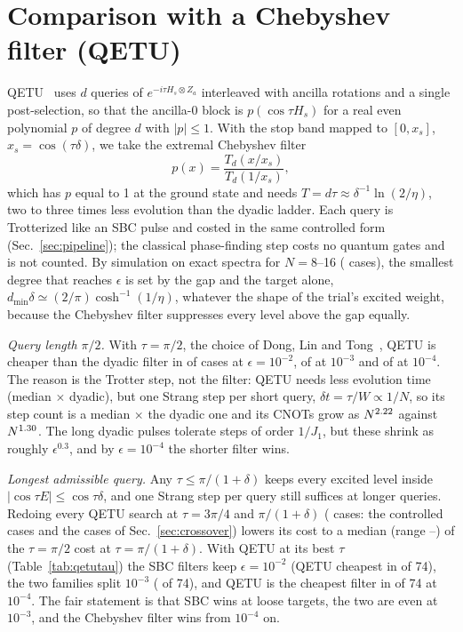 \documentclass[aps,pra,twocolumn,superscriptaddress,nofootinbib]{revtex4-2}
\begin{document}
\section{Comparison with a Chebyshev filter (QETU)}
\label{sec:qetu}

QETU~\cite{Dong2022} uses $d$ queries of $e^{-i\tau H_s\otimes Z_a}$ interleaved with ancilla rotations and a single
post-selection, so that the ancilla-0 block is $p(\cos\tau H_s)$ for a real even polynomial $p$ of degree $d$ with
$|p|\le1$. With the stop band mapped to $[0,x_s]$, $x_s=\cos(\tau\delta)$, we take the extremal Chebyshev filter
\begin{equation}
p(x)=\frac{T_d(x/x_s)}{T_d(1/x_s)},
\end{equation}
which has $p$ equal to 1 at the ground state and needs $T=d\tau\approx\delta^{-1}\ln(2/\eta)$, two to three times less
evolution than the dyadic ladder. Each query is Trotterized like an SBC pulse and costed in the same controlled form
(Sec.~\ref{sec:pipeline}); the classical phase-finding step costs no quantum gates and is not counted. By simulation
on exact spectra for $N=8$--16 (\empN{} cases), the smallest degree that reaches $\epsilon$ is set by the gap and the
target alone, $d_{\min}\delta\simeq(2/\pi)\cosh^{-1}(1/\eta)$, whatever the shape of the trial's excited weight,
because the Chebyshev filter suppresses every level above the gap equally.

\emph{Query length $\pi/2$.} With $\tau=\pi/2$, the choice of Dong, Lin and Tong~\cite{Dong2022}, QETU is cheaper than
the dyadic filter in \goQetuWinsTwo{} of \goCasesTwo{} cases at $\epsilon=10^{-2}$, \goQetuWinsThree{} of
\goCasesThree{} at $10^{-3}$ and \goQetuWinsFour{} of \goCasesFour{} at $10^{-4}$. The reason is the Trotter step, not
the filter: QETU needs less evolution time (median \fQDtime$\times$ dyadic), but one Strang step per short query,
$\delta t=\tau/W\propto1/N$, so its step count is a median \fQDsteps$\times$ the dyadic one and its CNOTs grow as
$N^{2.22}$ against $N^{1.30}$. The long dyadic pulses tolerate steps of order $1/J_1$, but these shrink as
roughly $\epsilon^{0.3}$, and by $\epsilon=10^{-4}$ the shorter filter wins.

\emph{Longest admissible query.} Any $\tau\le\pi/(1+\delta)$ keeps every excited level inside
$|\cos\tau E|\le\cos\tau\delta$, and one Strang step per query still suffices at longer queries. Redoing every QETU
search at $\tau=3\pi/4$ and $\pi/(1+\delta)$ (\tauNcases{} cases: the \tauNgo{} controlled cases and the \tauNact{} cases of Sec.~\ref{sec:crossover}) lowers its cost to a median \tauPiMed{} (range
\tauPiMin--\tauPiMax) of the $\tau=\pi/2$ cost at $\tau=\pi/(1+\delta)$. With QETU at its best $\tau$
(Table~\ref{tab:qetutau}) the SBC filters keep $\epsilon=10^{-2}$ (QETU cheapest in \tauBestQeTwo{} of 74), the two
families split $10^{-3}$ (\tauBestQeThree{} of 74), and QETU is the cheapest filter in \tauBestQeFour{} of 74 at
$10^{-4}$. The fair statement is that SBC wins at loose targets, the two are even at $10^{-3}$, and the Chebyshev
filter wins from $10^{-4}$ on.
\end{document}
